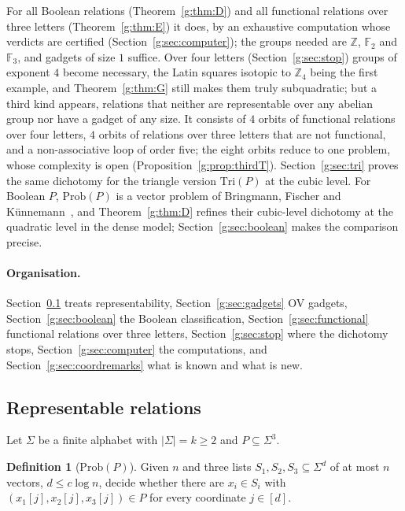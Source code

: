 \documentclass[11pt]{article}
\theoremstyle{definition}
\newtheorem{definition}[theorem]{Definition}
\theoremstyle{remark}
\newcommand{\Z}{\mathbb{Z}}
\newcommand{\F}{\mathbb{F}_2}
\newcommand{\Prob}{\mathrm{Prob}}
\begin{document}
For all Boolean relations (Theorem~\ref{g:thm:D}) and all functional relations over three letters (Theorem~\ref{g:thm:E}) it does, by an exhaustive computation whose verdicts are certified (Section~\ref{g:sec:computer}); the groups needed are $\Z$, $\F$ and $\mathbb F_3$, and gadgets of size $1$ suffice. Over four letters (Section~\ref{g:sec:stop}) groups of exponent $4$ become necessary, the Latin squares isotopic to $\Z_4$ being the first example, and Theorem~\ref{g:thm:G} still makes them truly subquadratic; but a third kind appears, relations that neither are representable over any abelian group nor have a gadget of any size. It consists of $4$ orbits of functional relations over four letters, $4$ orbits of relations over three letters that are not functional, and a non-associative loop of order five; the eight orbits reduce to one problem, whose complexity is open (Proposition~\ref{g:prop:thirdT}). Section~\ref{g:sec:tri} proves the same dichotomy for the triangle version $\mathrm{Tri}(P)$ at the cubic level. For Boolean $P$, $\Prob(P)$ is a vector problem of Bringmann, Fischer and Künnemann~\cite{BFK19}, and Theorem~\ref{g:thm:D} refines their cubic-level dichotomy at the quadratic level in the dense model; Section~\ref{g:sec:boolean} makes the comparison precise.

\paragraph{Organisation.} Section~\ref{g:sec:rep} treats representability, Section~\ref{g:sec:gadgets} OV gadgets, Section~\ref{g:sec:boolean} the Boolean classification, Section~\ref{g:sec:functional} functional relations over three letters, Section~\ref{g:sec:stop} where the dichotomy stops, Section~\ref{g:sec:computer} the computations, and Section~\ref{g:sec:coordremarks} what is known and what is new.

\subsection{Representable relations}\label{g:sec:rep}

Let $\Sigma$ be a finite alphabet with $|\Sigma|=k\ge2$ and $P\subseteq\Sigma^3$.

\begin{definition}[$\Prob(P)$]\label{g:def:prob}
Given $n$ and three lists $S_1,S_2,S_3\subseteq\Sigma^d$ of at most $n$ vectors, $d\le c\log n$, decide whether there are $x_i\in S_i$ with $(x_1[j],x_2[j],x_3[j])\in P$ for every coordinate $j\in[d]$.
\end{definition}
\end{document}

